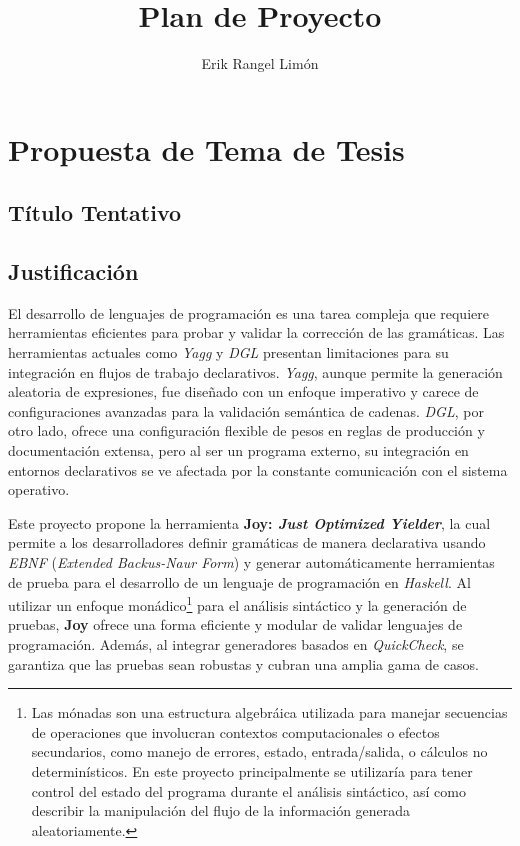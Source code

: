 \documentclass[11pt]{article}
\title{Plan de Proyecto}
\author{Erik Rangel Limón}
\date{}
\begin{document}

\maketitle

\section*{Propuesta de Tema de Tesis}

\subsection*{Título Tentativo}


\subsection*{Justificación}

El desarrollo de lenguajes de programación es una tarea compleja que requiere herramientas eficientes para probar y validar la corrección de las gramáticas. Las herramientas actuales como \textit{Yagg}\cite{yagg} y \textit{DGL}\cite{dgl} presentan limitaciones para su integración en flujos de trabajo declarativos. \textit{Yagg}, aunque permite la generación aleatoria de expresiones, fue diseñado con un enfoque imperativo y carece de configuraciones avanzadas para la validación semántica de cadenas. \textit{DGL}, por otro lado, ofrece una configuración flexible de pesos en reglas de producción y documentación extensa, pero al ser un programa externo, su integración en entornos declarativos se ve afectada por la constante comunicación con el sistema operativo.

Este proyecto propone la herramienta \textbf{Joy: \textit{Just Optimized Yielder}}, la cual permite a los desarrolladores definir gramáticas de manera declarativa usando \textit{EBNF} (\textit{Extended Backus-Naur Form}) y generar automáticamente herramientas de prueba para el desarrollo de un lenguaje de programación en \textit{Haskell}. Al utilizar un enfoque monádico\footnote[1]{Las mónadas son una estructura algebráica utilizada para manejar secuencias de operaciones que involucran contextos computacionales o efectos secundarios, como manejo de errores, estado, entrada/salida, o cálculos no determinísticos. En este proyecto principalmente se utilizaría para tener control del estado del programa durante el análisis sintáctico, así como describir la manipulación del flujo de la información generada aleatoriamente.} para el análisis sintáctico y la generación de pruebas, \textbf{Joy} ofrece una forma eficiente y modular de validar lenguajes de programación. Además, al integrar generadores basados en \textit{QuickCheck}\cite{quickcheck_manual}, se garantiza que las pruebas sean robustas y cubran una amplia gama de casos.
\end{document}
